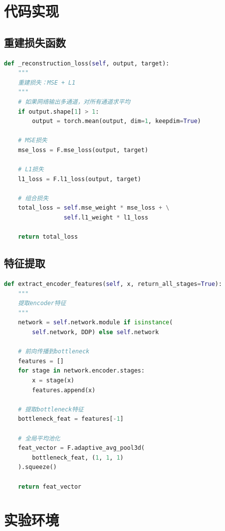 \documentclass[11pt,a4paper]{article}
\begin{document}
\appendix

\section{代码实现}

\subsection{重建损失函数}

\begin{lstlisting}[language=Python, caption=重建损失实现]
def _reconstruction_loss(self, output, target):
    """
    重建损失：MSE + L1
    """
    # 如果网络输出多通道，对所有通道求平均
    if output.shape[1] > 1:
        output = torch.mean(output, dim=1, keepdim=True)

    # MSE损失
    mse_loss = F.mse_loss(output, target)

    # L1损失
    l1_loss = F.l1_loss(output, target)

    # 组合损失
    total_loss = self.mse_weight * mse_loss + \
                 self.l1_weight * l1_loss

    return total_loss
\end{lstlisting}

\subsection{特征提取}

\begin{lstlisting}[language=Python, caption=Encoder特征提取]
def extract_encoder_features(self, x, return_all_stages=True):
    """
    提取encoder特征
    """
    network = self.network.module if isinstance(
        self.network, DDP) else self.network

    # 前向传播到bottleneck
    features = []
    for stage in network.encoder.stages:
        x = stage(x)
        features.append(x)

    # 提取bottleneck特征
    bottleneck_feat = features[-1]

    # 全局平均池化
    feat_vector = F.adaptive_avg_pool3d(
        bottleneck_feat, (1, 1, 1)
    ).squeeze()

    return feat_vector
\end{lstlisting}

\section{实验环境}
\end{document}
